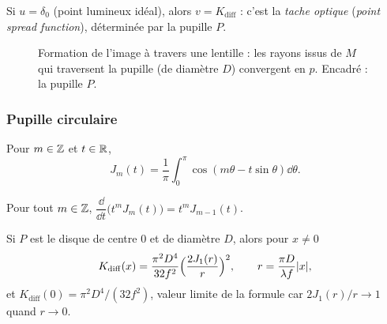 \begin{remark}
  Si $u=\delta_0$ (point lumineux idéal), alors $v=K_{\mathrm{diff}}$ : c'est la \emph{tache optique} (\emph{point spread function}), déterminée par la pupille $P$.
\end{remark}

\begin{figure}[!htb]\centering
  
  \caption{Formation de l'image à travers une lentille : les rayons issus de $M$ qui traversent la pupille (de diamètre $D$) convergent en $p$. Encadré : la pupille $P$.}\label{fig:lens-diffraction}
\end{figure}

\subsubsection*{Pupille circulaire}
\begin{definition}\label{def:bessel}
  Pour $m\in\mathbb{Z}$ et $t\in\mathbb{R}$,
  \[
    J_m(t)=\frac{1}{\pi}\int_0^{\pi}\cos(m\theta-t\sin\theta)\dd\theta .
  \]
\end{definition}

\begin{lemma}\label{lem:bessel-deriv}
  Pour tout $m\in\mathbb{Z}$, $\dfrac{\dd}{\dd t}\bigl(t^mJ_m(t)\bigr)=t^mJ_{m-1}(t)$.
\end{lemma}

\begin{proposition}\label{prop:airy}
  Si $P$ est le disque de centre $0$ et de diamètre $D$, alors pour $x\neq0$
  \[
    K_{\mathrm{diff}}(x)=\frac{\pi^2D^4}{32f^2}\Bigl(\frac{2J_1(r)}{r}\Bigr)^2,\qquad r=\frac{\pi D}{\lambda f}\lvert x\rvert,
  \]
  et $K_{\mathrm{diff}}(0)=\pi^2D^4/(32f^2)$, valeur limite de la formule car $2J_1(r)/r\to1$ quand $r\to0$.
\end{proposition}

